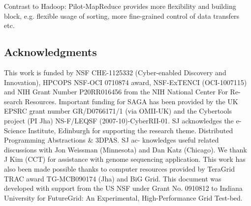 \documentclass{acm_proc_article-sp}
\begin{document}
Contrast to Hadoop:
Pilot-MapReduce provides more flexibility and building block, e.g. flexible 
usage of sorting, more fine-grained control of data transfers etc.

%

%
%
%


\subsection*{Acknowledgments}
\scriptsize
This work is funded by NSF CHE-1125332 (Cyber-enabled Discovery and
Innovation), HPCOPS NSF-OCI 0710874 award, NSF-ExTENCI (OCI-1007115) and NIH
Grant Number P20RR016456 from the NIH National Center For Re- search
Resources. Important funding for SAGA has been provided by the UK EPSRC grant
number GR/D0766171/1 (via OMII-UK) and the Cybertools project (PI Jha) 
NS-F/LEQSF (2007-10)-CyberRII-01. SJ acknowledges the e-Science Institute,
Edinburgh for supporting the research theme. Distributed Programming
Abstractions \& 3DPAS. SJ ac- knowledges useful related discussions with Jon
Weissman (Minnesota) and Dan Katz (Chicago). We thank J Kim (CCT) for
assistance with genome sequencing application. This work has also been made
possible thanks to computer resources provided by TeraGrid TRAC award
TG-MCB090174 (Jha) and BiG Grid. This document was developed with support from
the US NSF under Grant No. 0910812 to Indiana University for FutureGrid: An
Experimental, High-Performance Grid Test-bed.
\end{document}
